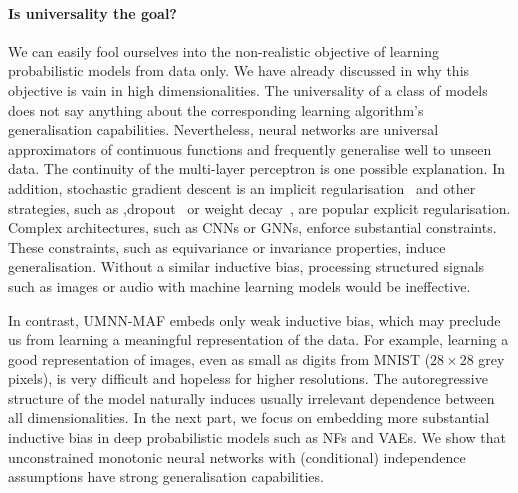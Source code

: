 
\paragraph{Is universality the goal?}
We can easily fool ourselves into the non-realistic objective of learning probabilistic models from data only. We have already discussed in  why this objective is vain in high dimensionalities. The universality of a class of models does not say anything about the corresponding learning algorithm's generalisation capabilities. Nevertheless, neural networks are universal approximators of continuous functions and frequently generalise well to unseen data. The continuity of the multi-layer perceptron is one possible explanation.
In addition, stochastic gradient descent is an implicit regularisation~\citep{smith2021origin, barrett2020implicit} and other strategies, such as ,dropout~\citep{srivastava2014dropout} or weight decay~\citep{krogh1991simple}, are popular explicit regularisation. Complex architectures, such as CNNs or GNNs, enforce substantial constraints. These constraints, such as equivariance or invariance properties, induce generalisation. Without a similar inductive bias, processing structured signals such as images or audio with machine learning models would be ineffective.

In contrast, UMNN-MAF embeds only weak inductive bias, which may preclude us from learning a meaningful representation of the data. For example, learning a good representation of images, even as small as digits from MNIST ($28 \times 28$ grey pixels), is very difficult and hopeless for higher resolutions. The autoregressive structure of the model naturally induces usually irrelevant dependence between all dimensionalities. In the next part, we focus on embedding more substantial inductive bias in deep probabilistic models such as NFs and VAEs. We show that unconstrained monotonic neural networks with (conditional) independence assumptions have strong generalisation capabilities.

